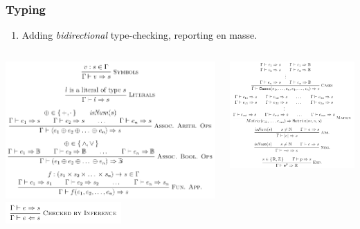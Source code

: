 \documentclass[xcolor={dvipsnames}]{beamer}
\begin{document}
\begin{frame}
  \frametitle{Typing}

  \begin{enumerate}
    \item Adding \emph{bidirectional} type-checking, reporting en masse.
  \end{enumerate}

  \begin{columns}
    \begin{column}{0.475\textwidth}
      \begin{center}
        \includegraphics[width=\textwidth]{typeRulesLeft.png}
        \includegraphics[width=0.55\textwidth]{typeRulesCheckByInfer.png}
      \end{center}
    \end{column}
    \hfill
    \begin{column}{0.475\textwidth}
      \begin{center}
        \includegraphics[width=\textwidth]{typeRulesRight.png}
      \end{center}
    \end{column}
  \end{columns}


\end{frame}
\end{document}
